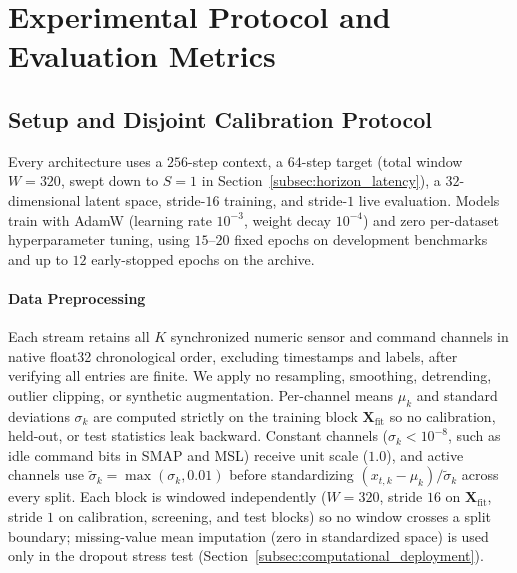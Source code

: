 \documentclass[journal]{IEEEtran}
\begin{document}
\section{Experimental Protocol and Evaluation Metrics}
\label{sec:exp}

\subsection{Setup and Disjoint Calibration Protocol}
\label{subsec:exp_setup}
Every architecture uses a $256$-step context, a $64$-step target (total window $W=320$, swept down to $S=1$ in Section~\ref{subsec:horizon_latency}), a $32$-dimensional latent space, stride-$16$ training, and stride-$1$ live evaluation. Models train with AdamW \cite{loshchilov2017decoupled} (learning rate $10^{-3}$, weight decay $10^{-4}$) and zero per-dataset hyperparameter tuning, using $15\text{--}20$ fixed epochs on development benchmarks and up to $12$ early-stopped epochs on the archive.

\paragraph{Data Preprocessing}
Each stream retains all $K$ synchronized numeric sensor and command channels in native float32 chronological order, excluding timestamps and labels, after verifying all entries are finite. We apply no resampling, smoothing, detrending, outlier clipping, or synthetic augmentation. Per-channel means $\mu_k$ and standard deviations $\sigma_k$ are computed strictly on the training block $\mathbf{X}_{\text{fit}}$ so no calibration, held-out, or test statistics leak backward. Constant channels ($\sigma_k < 10^{-8}$, such as idle command bits in SMAP and MSL) receive unit scale ($1.0$), and active channels use $\tilde{\sigma}_k = \max(\sigma_k, 0.01)$ before standardizing $(x_{t,k}-\mu_k)/\tilde{\sigma}_k$ across every split. Each block is windowed independently ($W=320$, stride $16$ on $\mathbf{X}_{\text{fit}}$, stride $1$ on calibration, screening, and test blocks) so no window crosses a split boundary; missing-value mean imputation (zero in standardized space) is used only in the dropout stress test (Section~\ref{subsec:computational_deployment}).
\end{document}
